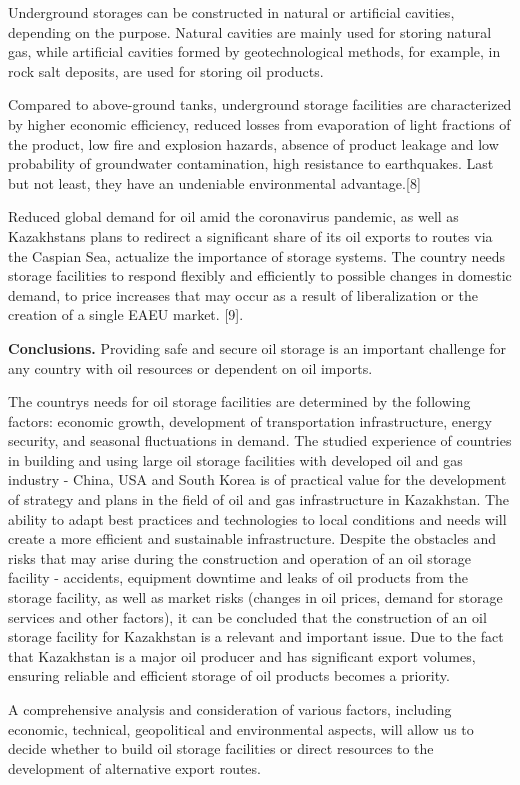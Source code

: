 \begin{multicols}{2}
Underground storages can be constructed in natural or artificial
cavities, depending on the purpose. Natural cavities are mainly used for
storing natural gas, while artificial cavities formed by
geotechnological methods, for example, in rock salt deposits, are used
for storing oil products.

Compared to above-ground tanks, underground storage facilities are
characterized by higher economic efficiency, reduced losses from
evaporation of light fractions of the product, low fire and explosion
hazards, absence of product leakage and low probability of groundwater
contamination, high resistance to earthquakes. Last but not least, they
have an undeniable environmental advantage.{[}8{]}

Reduced global demand for oil amid the coronavirus pandemic, as well as
Kazakhstan\textquotesingle s plans to redirect a significant share of
its oil exports to routes via the Caspian Sea, actualize the importance
of storage systems. The country needs storage facilities to respond
flexibly and efficiently to possible changes in domestic demand, to
price increases that may occur as a result of liberalization or the
creation of a single EAEU market. {[}9{]}.

{\bfseries Conclusions.} Providing safe and secure oil storage is an
important challenge for any country with oil resources or dependent on
oil imports.

The country\textquotesingle s needs for oil storage facilities are
determined by the following factors: economic growth, development of
transportation infrastructure, energy security, and seasonal
fluctuations in demand. The studied experience of countries in building
and using large oil storage facilities with developed oil and gas
industry - China, USA and South Korea is of practical value for the
development of strategy and plans in the field of oil and gas
infrastructure in Kazakhstan. The ability to adapt best practices and
technologies to local conditions and needs will create a more efficient
and sustainable infrastructure. Despite the obstacles and risks that may
arise during the construction and operation of an oil storage facility -
accidents, equipment downtime and leaks of oil products from the storage
facility, as well as market risks (changes in oil prices, demand for
storage services and other factors), it can be concluded that the
construction of an oil storage facility for Kazakhstan is a relevant and
important issue. Due to the fact that Kazakhstan is a major oil producer
and has significant export volumes, ensuring reliable and efficient
storage of oil products becomes a priority.

A comprehensive analysis and consideration of various factors, including
economic, technical, geopolitical and environmental aspects, will allow
us to decide whether to build oil storage facilities or direct resources
to the development of alternative export routes.
\end{multicols}

